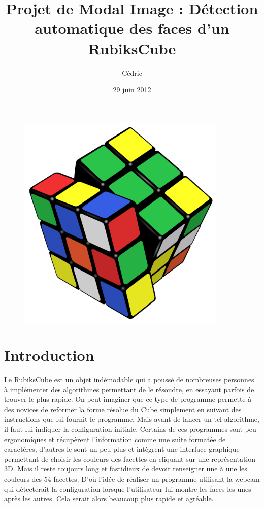 \documentclass[a4paper,11pt]{article}
\title{Projet de Modal Image : Détection automatique des faces d'un RubiksCube}
\author{Cédric \bsc{Dessez}}
\date{29 juin 2012}
\begin{document}
\maketitle

\begin{figure}[h]
\begin{center}
 \includegraphics[width=10cm]{garde.png} 
\end{center}
\end{figure}

\newpage
\tableofcontents
\newpage

\section{Introduction}
Le RubiksCube est un objet indémodable qui a poussé de nombreuses personnes à implémenter des algorithmes 
permettant de le résoudre, en essayant parfois de trouver le plus rapide. On peut imaginer que ce type de 
programme permette à des novices de reformer la forme résolue du Cube simplement en suivant des instructions
que lui fournit le programme.
Mais avant de lancer un tel algorithme, il faut lui indiquer la configuration initiale.
Certains de ces programmes sont peu ergonomiques et récupèrent l'information comme une suite formatée de 
caractères, d'autres le sont un peu plus et intègrent une interface graphique permettant de choisir les couleurs des
facettes en cliquant sur une représentation 3D. Mais il reste toujours long et fastidieux de devoir renseigner
une à une les couleurs des 54 facettes. D'où l'idée de réaliser un programme utilisant la webcam qui détecterait
la configuration lorsque l'utilisateur lui montre les faces les unes après les autres. Cela serait alors beaucoup
plus rapide et agréable.
\end{document}
